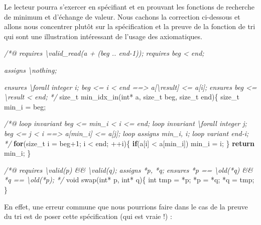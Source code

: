 \documentclass[12pt,francais,]{scrbook}
\newenvironment{Shaded}{}{}
\newcommand{\KeywordTok}[1]{\textcolor[rgb]{0.00,0.44,0.13}{\textbf{{#1}}}}
\newcommand{\DataTypeTok}[1]{\textcolor[rgb]{0.56,0.13,0.00}{{#1}}}
\newcommand{\DecValTok}[1]{\textcolor[rgb]{0.25,0.63,0.44}{{#1}}}
\newcommand{\CommentTok}[1]{\textcolor[rgb]{0.38,0.63,0.69}{\textit{{#1}}}}
\newcommand{\NormalTok}[1]{{#1}}
\newenvironment{zdssecretblock}[1]{%
  \tcolorbox[beamer,%
    noparskip,breakable,
    colback=LightGray,colframe=DarkGray,%
    colbacklower=LightGray,%
    title=#1]
}{\endtcolorbox}
\begin{document}
Le lecteur pourra s'exercer en spécifiant et en prouvant les fonctions
de recherche de minimum et d'échange de valeur. Nous cachons la
correction ci-dessous et allons nous concentrer plutôt sur la
spécification et la preuve de la fonction de tri qui sont une
illustration intéressant de l'usage des axiomatiques.

\begin{zdssecretblock}{Solution}
  \begin{footnotesize}
  \begin{footnotesize}\begin{Shaded}
\begin{Highlighting}[]
\CommentTok{/*@}
\CommentTok{  requires \textbackslash{}valid_read(a + (beg .. end-1));}
\CommentTok{  requires beg < end;}

\CommentTok{  assigns  \textbackslash{}nothing;}

\CommentTok{  ensures  \textbackslash{}forall integer i; beg <= i < end ==> a[\textbackslash{}result] <= a[i];}
\CommentTok{  ensures  beg <= \textbackslash{}result < end;}
\CommentTok{*/}
\NormalTok{size_t min_idx_in(}\DataTypeTok{int}\NormalTok{* a, size_t beg, size_t end)\{}
  \NormalTok{size_t min_i = beg;}

  \CommentTok{/*@}
\CommentTok{    loop invariant beg <= min_i < i <= end;}
\CommentTok{    loop invariant \textbackslash{}forall integer j; beg <= j < i ==> a[min_i] <= a[j];}
\CommentTok{    loop assigns min_i, i;}
\CommentTok{    loop variant end-i;}
\CommentTok{  */}
  \KeywordTok{for}\NormalTok{(size_t i = beg}\DecValTok{+1}\NormalTok{; i < end; ++i)\{}
    \KeywordTok{if}\NormalTok{(a[i] < a[min_i]) min_i = i;}
  \NormalTok{\}}
  \KeywordTok{return} \NormalTok{min_i;}
\NormalTok{\}}

\CommentTok{/*@}
\CommentTok{  requires \textbackslash{}valid(p) && \textbackslash{}valid(q);}
\CommentTok{  assigns  *p, *q;}
\CommentTok{  ensures  *p == \textbackslash{}old(*q) && *q == \textbackslash{}old(*p);}
\CommentTok{*/}
\DataTypeTok{void} \NormalTok{swap(}\DataTypeTok{int}\NormalTok{* p, }\DataTypeTok{int}\NormalTok{* q)\{}
  \DataTypeTok{int} \NormalTok{tmp = *p; *p = *q; *q = tmp;}
\NormalTok{\}}
\end{Highlighting}
  \end{Shaded}\end{footnotesize}
  \end{footnotesize}
\end{zdssecretblock}

En effet, une erreur commune que nous pourrions faire dans le cas de la
preuve du tri est de poser cette spécification (qui est vraie !) :
\end{document}
